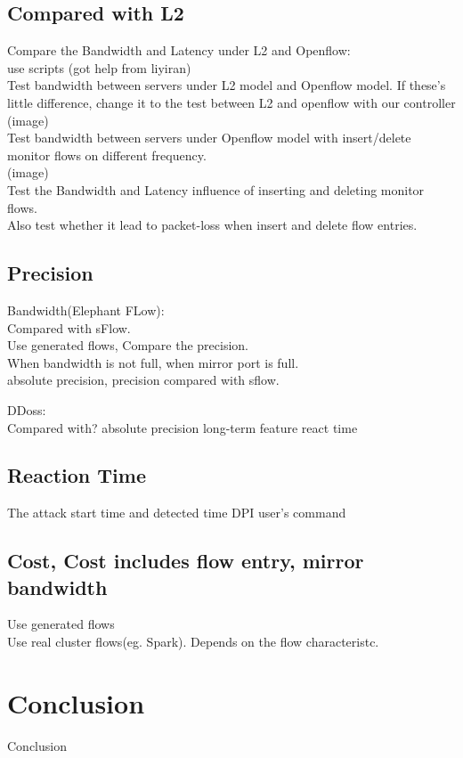 \documentclass{acm_proc_article-sp}
\begin{document}
\subsection{Compared with L2}
Compare the Bandwidth and Latency under L2 and Openflow:\\
use scripts (got help from liyiran)\\
Test bandwidth between servers under L2 model and Openflow model. If these's little difference, change it to the test between L2 and openflow with our controller\\
(image)\\
Test bandwidth between servers under Openflow model with insert/delete monitor flows on different frequency.\\
(image)\\

Test the Bandwidth and Latency influence of inserting and deleting monitor flows.\\
Also test whether it lead to packet-loss when insert and delete flow entries.\\

\subsection{Precision}
Bandwidth(Elephant FLow):\\
Compared with sFlow.\\
Use generated flows, Compare the precision.\\
When bandwidth is not full, when mirror port is full.\\
absolute precision, precision compared with sflow.

DDoss:\\
Compared with?
absolute precision
long-term feature
react time

\subsection{Reaction Time}
The attack start time and detected time
DPI
user's command

\subsection{Cost, Cost includes flow entry, mirror bandwidth}
Use generated flows\\
Use real cluster flows(eg. Spark). Depends on the flow characteristc.


\section{Conclusion}
Conclusion\\




\end{document}
